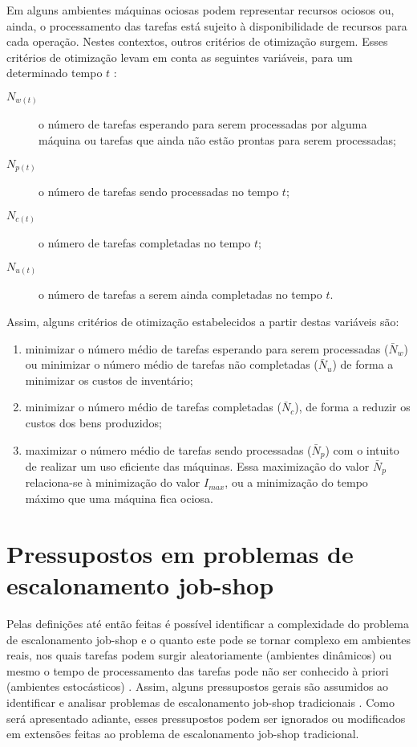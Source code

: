 \documentclass[relatorio,nocolorlinks]{inf-ufg}
\begin{document}
Em alguns ambientes m\'{a}quinas ociosas podem representar recursos ociosos ou, ainda, o processamento das tarefas est\'{a} sujeito \`{a}
disponibilidade de recursos para cada opera\c{c}\~{a}o. Nestes contextos, outros crit\'{e}rios de otimiza\c{c}\~{a}o surgem. Esses crit\'{e}rios
de otimiza\c{c}\~{a}o levam em conta as seguintes vari\'{a}veis, para um determinado tempo $t$ \cite{French1982}:

\begin{description}
\item[$N_{w(t)}$] o n\'{u}mero de tarefas esperando para serem processadas por alguma m\'{a}quina ou tarefas que ainda n\~{a}o est\~{a}o prontas
para serem processadas;
\item[$N_{p(t)}$] o n\'{u}mero de tarefas sendo processadas no tempo $t$;
\item[$N_{c(t)}$] o n\'{u}mero de tarefas completadas no tempo $t$;
\item[$N_{u(t)}$] o n\'{u}mero de tarefas a serem ainda completadas no tempo $t$.
\end{description}

Assim, alguns crit\'{e}rios de otimiza\c{c}\~{a}o estabelecidos a partir destas vari\'{a}veis s\~{a}o:

\begin{enumerate}
\item minimizar o n\'{u}mero m\'{e}dio de tarefas esperando para serem processadas ($\bar{N}_{w}$) ou minimizar o n\'{u}mero m\'{e}dio de
tarefas n\~{a}o completadas ($\bar{N}_{u}$) de forma a minimizar os custos de invent\'{a}rio;
\item minimizar o n\'{u}mero m\'{e}dio de tarefas completadas ($\bar{N}_{c}$), de forma a reduzir os custos dos bens produzidos;
\item maximizar o n\'{u}mero m\'{e}dio de tarefas sendo processadas ($\bar{N}_{p}$) com o intuito de realizar um uso eficiente das m\'{a}quinas.
Essa maximiza\c{c}\~{a}o do valor $\bar{N}_{p}$ relaciona-se \`{a} minimiza\c{c}\~{a}o do valor $I_{max}$, ou a minimiza\c{c}\~{a}o do tempo
m\'{a}ximo que uma m\'{a}quina fica ociosa.
\end{enumerate}

\section{Pressupostos em problemas de escalonamento job-shop}

Pelas defini\c{c}\~{o}es at\'{e} ent\~{a}o feitas \'{e} poss\'{i}vel identificar a complexidade do problema de escalonamento job-shop e o quanto
este pode se tornar complexo em ambientes reais, nos quais tarefas podem surgir aleatoriamente (ambientes din\^{a}micos) ou mesmo o tempo de
processamento das tarefas pode n\~{a}o ser conhecido \`{a} priori (ambientes estoc\'{a}sticos) \cite{French1982}. Assim, alguns pressupostos
gerais s\~{a}o assumidos ao identificar e analisar problemas de escalonamento job-shop tradicionais \cite{French1982}. Como ser\'{a} apresentado
adiante, esses pressupostos podem ser ignorados ou modificados em extens\~{o}es feitas ao problema de escalonamento job-shop tradicional.
\end{document}

